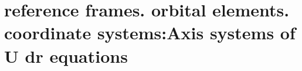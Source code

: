 \section{ reference frames. orbital elements. coordinate systems:Axis systems of U dr equations  }\label{sec:q2}    
